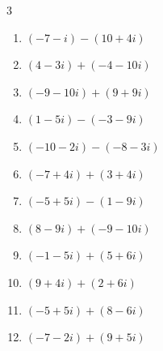 \begin{multicols}{3}
\begin{enumerate}
        \phantom{$\displaystyle =-2-i$}

  \item $\displaystyle (-7-i) - (10+4i)$

        \phantom{$\displaystyle =-17-5i$}

  \item $\displaystyle (4-3i) + (-4-10i)$

        \phantom{$\displaystyle =-13i$}

  \item $\displaystyle (-9-10i) + (9+9i)$

        \phantom{$\displaystyle =-i$}

  \item $\displaystyle (1-5i) - (-3-9i)$

        \phantom{$\displaystyle =4+4i$}

  \item $\displaystyle (-10-2i) - (-8-3i)$

        \phantom{$\displaystyle =-2+i$}

  \item $\displaystyle (-7+4i) + (3+4i)$

        \phantom{$\displaystyle =-4+8i$}

  \item $\displaystyle (-5+5i) - (1-9i)$

        \phantom{$\displaystyle =-6+14i$}

\columnbreak %

\resetques

  \item $\displaystyle (8-9i) + (-9-10i)$

        \phantom{$\displaystyle =-1-19i$}

  \item $\displaystyle (-1-5i) + (5+6i)$

        \phantom{$\displaystyle =4+i$}

  \item $\displaystyle (9+4i) + (2+6i)$

        \phantom{$\displaystyle =11+10i$}

  \item $\displaystyle (-5+5i) + (8-6i)$

        \phantom{$\displaystyle =3-i$}

  \item $\displaystyle (-7-2i) + (9+5i)$

        \phantom{$\displaystyle =2+3i$}


\end{enumerate}
\end{multicols}

